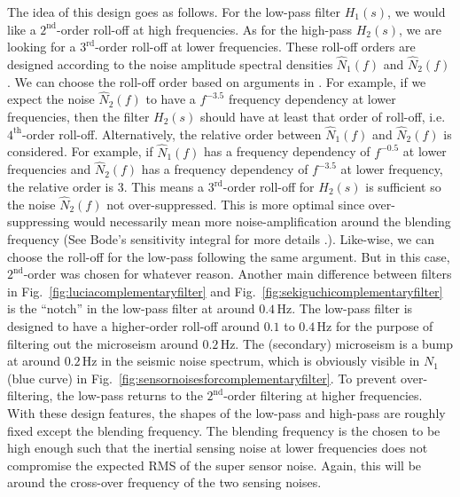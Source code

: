 The idea of this design goes as follows.
For the low-pass filter $H_1(s)$, we would like a $2^\mathrm{nd}$-order roll-off at high frequencies.
As for the high-pass $H_2(s)$, we are looking for a $3^\mathrm{rd}$-order roll-off at lower frequencies.
These roll-off orders are designed according to the noise amplitude spectral densities $\hat{N}_1(f)$ and $\hat{N}_2(f)$.
We can choose the roll-off order based on arguments in \cite{Sekiguchi:2016bmv}.
For example, if we expect the noise $\hat{N}_2(f)$ to have a $f^{-3.5}$ frequency dependency at lower frequencies, then the filter $H_2(s)$ should have at least that order of roll-off, i.e. $4^\mathrm{th}$-order roll-off.
Alternatively, the relative order between $\hat{N}_1(f)$ and $\hat{N}_2(f)$ is considered.
For example, if $\hat{N}_1(f)$ has a frequency dependency of $f^{-0.5}$ at lower frequencies and $\hat{N}_2(f)$ has a frequency dependency of $f^{-3.5}$ at lower frequency, the relative order is 3.
This means a $3^\mathrm{rd}$-order roll-off for $H_2(s)$ is sufficient so the noise $\hat{N}_2(f)$ not over-suppressed.
This is more optimal since over-suppressing would necessarily mean more noise-amplification around the blending frequency (See Bode's sensitivity integral for more details \cite{wiki:bode's_sensitivity_integral}.).
Like-wise, we can choose the roll-off for the low-pass following the same argument.
But in this case, $2^\mathrm{nd}$-order was chosen for whatever reason.
Another main difference between filters in Fig.~\ref{fig:luciacomplementaryfilter} and Fig.~\ref{fig:sekiguchicomplementaryfilter} is the ``notch'' in the low-pass filter at around $0.4\,\mathrm{Hz}$.
The low-pass filter is designed to have a higher-order roll-off around $0.1$ to $0.4\,\mathrm{Hz}$ for the purpose of filtering out the microseism around $0.2\,\mathrm{Hz}$.
The (secondary) microseism \cite{wiki:microseism} is a bump at around $0.2\,\mathrm{Hz}$ in the seismic noise spectrum, which is obviously visible in $N_1$ (blue curve) in Fig.~\ref{fig:sensornoisesforcomplementaryfilter}.
To prevent over-filtering, the low-pass returns to the $2^\mathrm{nd}$-order filtering at higher frequencies.
With these design features, the shapes of the low-pass and high-pass are roughly fixed except the blending frequency.
The blending frequency is the chosen to be high enough such that the inertial sensing noise at lower frequencies does not compromise the expected RMS of the super sensor noise.
Again, this will be around the cross-over frequency of the two sensing noises.

